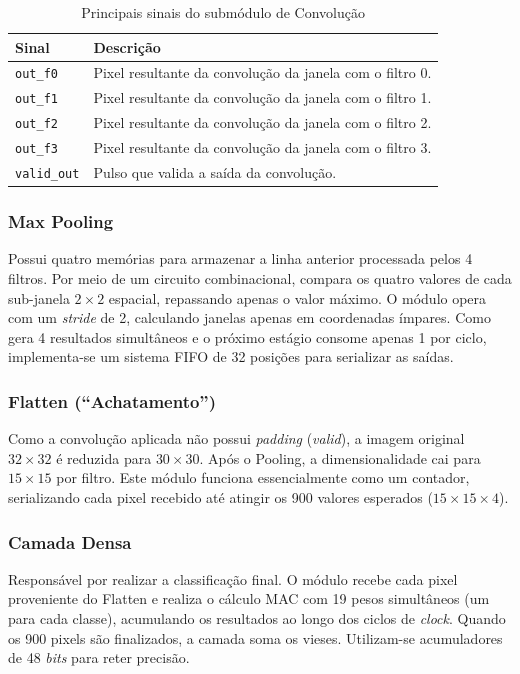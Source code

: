 \begin{table}[htbp]
\centering
\caption{Principais sinais do submódulo de Convolução}
\label{tab:sinais_convolucao}
\small
\begin{tabularx}{\textwidth}{l X}
\toprule
\textbf{Sinal} & \textbf{Descrição} \\
\midrule
\texttt{out\_f0} & Pixel resultante da convolução da janela com o filtro 0. \\
\texttt{out\_f1} & Pixel resultante da convolução da janela com o filtro 1. \\
\texttt{out\_f2} & Pixel resultante da convolução da janela com o filtro 2. \\
\texttt{out\_f3} & Pixel resultante da convolução da janela com o filtro 3. \\
\texttt{valid\_out} & Pulso que valida a saída da convolução. \\
\bottomrule
\end{tabularx}
\end{table}

\subsubsection{Max Pooling}
Possui quatro memórias para armazenar a linha anterior processada pelos 4 filtros. Por meio de um circuito combinacional, compara os quatro valores de cada sub-janela $2 \times 2$ espacial, repassando apenas o valor máximo. O módulo opera com um \textit{stride} de 2, calculando janelas apenas em coordenadas ímpares. Como gera 4 resultados simultâneos e o próximo estágio consome apenas 1 por ciclo, implementa-se um sistema FIFO de 32 posições para serializar as saídas.

\subsubsection{Flatten (``Achatamento'')}
Como a convolução aplicada não possui \textit{padding} (\textit{valid}), a imagem original $32 \times 32$ é reduzida para $30 \times 30$. Após o Pooling, a dimensionalidade cai para $15 \times 15$ por filtro. Este módulo funciona essencialmente como um contador, serializando cada pixel recebido até atingir os 900 valores esperados ($15 \times 15 \times 4$).

\subsubsection{Camada Densa}
Responsável por realizar a classificação final. O módulo recebe cada pixel proveniente do Flatten e realiza o cálculo MAC com 19 pesos simultâneos (um para cada classe), acumulando os resultados ao longo dos ciclos de \textit{clock}. Quando os 900 pixels são finalizados, a camada soma os vieses. Utilizam-se acumuladores de 48 \textit{bits} para reter precisão.

